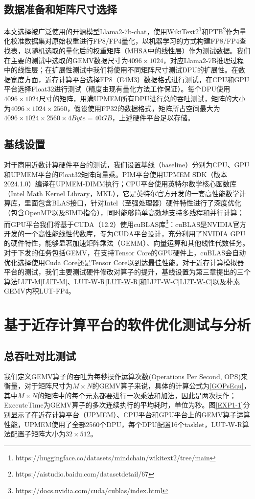 \subsection{数据准备和矩阵尺寸选择}
本文选择被广泛使用的开源模型Llama2-7b-chat，使用WikiText2\footnote{https://huggingface.co/datasets/mindchain/wikitext2/tree/main}和PTB\footnote{https://aistudio.baidu.com/datasetdetail/67}作为量化校准数据集对原始权重进行FP8/FP4量化，以机器学习的方式构建FP8/FP4查找表，以随机选取的量化后的权重矩阵（MHSA中的线性层）作为测试数据。我们在主要的测试中选取的GEMV数据尺寸为$4096\times 1024$，对应Llama2-7B推理过程中的线性层；在扩展性测试中我们将使用不同矩阵尺寸测试DPU的扩展性。在数据宽度方面，近存计算平台选择FP8（E4M3）数据格式进行测试，在CPU和GPU平台选择Float32进行测试（精度由现有量化方法工作保证）。每个DPU使用$4096\times 1024$尺寸的矩阵，用满UPMEM所有DPU进行总的吞吐测试，矩阵的大小为$4096\times 1024\times 2560$，假设使用FP32的数据格式，矩阵所占空间最大为$4096\times 1024\times 2560\times 4Byte=40GB$，上述硬件平台足以存储。

\subsection{基线设置}
对于商用近数计算硬件平台的测试，我们设置基线（baseline）分别为CPU、GPU和UPMEM平台的Float32矩阵向量乘。PIM平台使用UPMEM SDK（版本 2024.1.0）编译在UPMEM-DIMM执行；CPU平台使用英特尔数学核心函数库（Intel Math Kernel Library，MKL）\cite{IntelMKL}，它是英特尔官方开发的一套高性能数学计算库，里面包含BLAS接口，针对Intel（至强处理器）硬件特性进行了深度优化（包含OpenMP以及SIMD指令），同时能够简单高效地支持多线程和并行计算；而GPU平台我们将基于CUDA（12.2）使用cuBLAS库\footnote{https://docs.nvidia.com/cuda/cublas/index.html}：cuBLAS是NVIDIA官方开发的一个高性能线性代数库，专为CUDA平台设计，充分利用了NVIDIA GPU的硬件特性，能够显著加速矩阵乘法（GEMM）、向量运算和其他线性代数任务。对于下发的任务包括GEMV，在支持Tensor Core的GPU硬件上，cuBLAS会自动优化选择使用Cuda Core还是Tensor Core以到达最佳性能。对于近存计算模拟器平台的测试，我们主要测试硬件修改对算子的提升，基线设置为第三章提出的三个算法LUT-M\ref{LUT-M}、LUT-W-R\ref{LUT-W-R}和LUT-W-C\ref{LUT-W-C}以及朴素GEMV内积LUT-FP4。

\section{基于近存计算平台的软件优化测试与分析}

\subsection{总吞吐对比测试}
我们定义GEMV算子的吞吐为每秒操作运算次数(Operations Per Second, OPS)来衡量，对于矩阵尺寸为$M\times N$的GEMV算子来说，具体的计算公式为\ref{GOPsEqu}，其中$M\times N$的矩阵中的每个元素都要进行一次乘法和加法，因此是两次操作；ExecuteTime为GEMV算子的多次连续执行的平均耗时，单位为秒。图\ref{EXP1-1}分别显示了在近存计算平台（UPMEM）、CPU平台和GPU平台上的GEMV算子运算性能，UPMEM使用了全部2560个DPU，每个DPU配置16个tasklet，LUT-W-R算法配置子矩阵大小为$32\times 512$。

